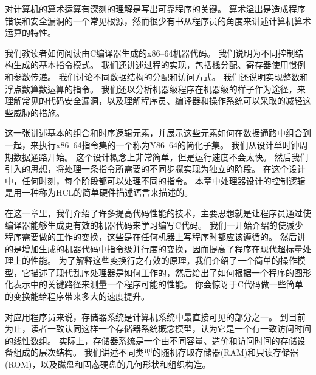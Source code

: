 {{\begin{description}
{                对计算机的算术运算有深刻的理解是写出可靠程序的关键。
                算术溢出是造成程序错误和安全漏洞的一个常见根源，然而很少有书从程序员的角度来讲述计算机算术运算的特性。
            }
            \item[第3章：程序的机器级表示]
            {
                我们教读者如何阅读由C编译器生成的x86--64机器代码。
                我们说明为不同控制结构生成的基本指令模式。
                我们还讲述过程的实现，包括栈分配、寄存器使用惯例和参数传递。
                我们讨论不同数据结构的分配和访问方式。
                我们还说明实现整数和浮点数算数运算的指令。
                我们还以分析机器级程序在机器级的样子作为途径，来理解常见的代码安全漏洞，以及理解程序员、编译器和操作系统可以采取的减轻这些威胁的措施。
            }
            \item[第4章：处理器体系结构]
            {
                这一张讲述基本的组合和时序逻辑元素，并展示这些元素如何在数据通路中组合到一起，来执行x86--64指令集的一个称为Y86--64的简化子集。
                我们从设计单时钟周期数据通路开始。
                这个设计概念上非常简单，但是运行速度不会太快。
                然后我们引入的思想，将处理一条指令所需要的不同步骤实现为独立的阶段。
                在这个设计中，任何时刻，每个阶段都可以处理不同的指令。
                本章中处理器设计的控制逻辑是用一种称为HCL的简单硬件描述语言来描述的。
            }
            \item[第5章：优化程序性能]
            {
                在这一章里，我们介绍了许多提高代码性能的技术，主要思想就是让程序员通过使编译器能够生成更有效的机器代码来学习编写C代码。
                我们一开始介绍的使减少程序需要做的工作的变换，这些是在任何机器上写程序时都应该遵循的。
                然后讲的是增加生成的机器代码中指令级并行度的变换，因而提高了程序在现代超标量处理上的性能。
                为了解释这些变换行之有效的原理，我们介绍了一个简单的操作模型，它描述了现代乱序处理器是如何工作的，然后给出了如何根据一个程序的图形化表示中的关键路径来测量一个程序可能的性能。
                你会惊讶于C代码做一些简单的变换能给程序带来多大的速度提升。
            }
            \item[第6章：存储器层次结构]
            {
                对应用程序员来说，存储器系统是计算机系统中最直接可见的部分之一。
                到目前为止，读者一致认同这样一个存储器系统概念模型，认为它是一个有一致访问时间的线性数组。
                实际上，存储器系统是一个由不同容量、造价和访问时间的存储设备组成的层次结构。
                我们讲述不同类型的随机存取存储器(RAM)和只读存储器(ROM)，以及磁盘和固态硬盘的几何形状和组织构造。
}
\end{description}}}
